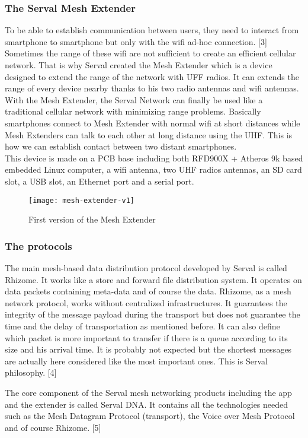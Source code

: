 \subsubsection{The Serval Mesh Extender}
To be able to establish communication between users, they need to interact from smartphone to smartphone but only with the wifi ad-hoc connection. [3] Sometimes the range of these wifi are not sufficient to create an efficient cellular network. That is why Serval created the Mesh Extender which is a device designed to extend the range of the network with UFF radios. It can extends the range of every device nearby thanks to his two radio antennas and wifi antennas. With the Mesh Extender, the Serval Network can finally be used like a traditional cellular network with minimizing range problems. Basically smartphones connect to Mesh Extender with normal wifi at short distances while Mesh Extenders can talk to each other at long distance using the UHF. This is how we can establish contact between two distant smartphones. \\
This device is made on a PCB base including both RFD900X + Atheros 9k based embedded Linux computer, a wifi antenna, two UHF radios antennas, an SD card slot, a USB slot, an Ethernet port and a serial port. 
\begin{figure}[h]
\centering
\texttt{[image: mesh-extender-v1]}
\caption{First version of the Mesh Extender}
\end{figure}

\subsubsection{The protocols}

\par
The main mesh-based data distribution protocol developed by Serval is called Rhizome. It works like a store and forward file distribution system. It operates on data packets containing meta-data and of course the data. Rhizome, as a mesh network protocol, works without centralized infrastructures. It guarantees the integrity of the message payload during the transport but does not guarantee the time and the delay of transportation as mentioned before. It can also define which packet is more important to transfer if there is a queue according to its size and his arrival time. It is probably not expected but the shortest messages are actually here considered like the most important ones. This is Serval philosophy. [4] 

\par
The core component of the Serval mesh networking products including the app and the extender is called Serval DNA. It contains all the technologies needed such as the Mesh Datagram Protocol (transport), the Voice over Mesh Protocol and of course Rhizome. [5]

